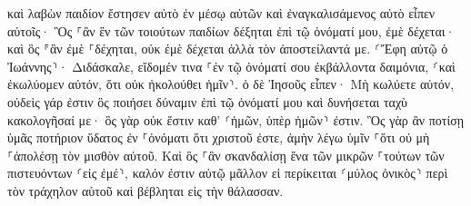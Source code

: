 \documentclass{openreader}
\begin{document}
καὶ λαβὼν παιδίον ἔστησεν αὐτὸ ἐν μέσῳ αὐτῶν καὶ ἐναγκαλισάμενος αὐτὸ εἶπεν αὐτοῖς· 
Ὃς ⸀ἂν ἓν τῶν τοιούτων παιδίων δέξηται ἐπὶ τῷ ὀνόματί μου, ἐμὲ δέχεται· καὶ ὃς ⸁ἂν ἐμὲ ⸀δέχηται, οὐκ ἐμὲ δέχεται ἀλλὰ τὸν ἀποστείλαντά με. 
⸂Ἔφη αὐτῷ ὁ Ἰωάννης⸃· Διδάσκαλε, εἴδομέν τινα ⸀ἐν τῷ ὀνόματί σου ἐκβάλλοντα δαιμόνια, ⸂καὶ ἐκωλύομεν αὐτόν, ὅτι οὐκ ἠκολούθει ἡμῖν⸃. 
ὁ δὲ Ἰησοῦς εἶπεν· Μὴ κωλύετε αὐτόν, οὐδεὶς γάρ ἐστιν ὃς ποιήσει δύναμιν ἐπὶ τῷ ὀνόματί μου καὶ δυνήσεται ταχὺ κακολογῆσαί με· 
ὃς γὰρ οὐκ ἔστιν καθ’ ⸂ἡμῶν, ὑπὲρ ἡμῶν⸃ ἐστιν. 
Ὃς γὰρ ἂν ποτίσῃ ὑμᾶς ποτήριον ὕδατος ἐν ⸀ὀνόματι ὅτι χριστοῦ ἐστε, ἀμὴν λέγω ὑμῖν ⸀ὅτι οὐ μὴ ⸀ἀπολέσῃ τὸν μισθὸν αὐτοῦ. 
Καὶ ὃς ⸀ἂν σκανδαλίσῃ ἕνα τῶν μικρῶν ⸀τούτων τῶν πιστευόντων ⸂εἰς ἐμέ⸃, καλόν ἐστιν αὐτῷ μᾶλλον εἰ περίκειται ⸂μύλος ὀνικὸς⸃ περὶ τὸν τράχηλον αὐτοῦ καὶ βέβληται εἰς τὴν θάλασσαν. 
\end{document}
